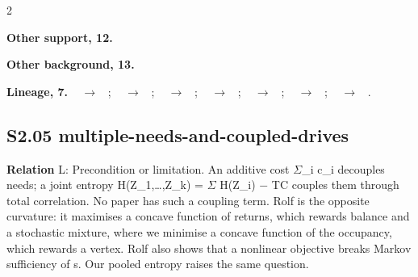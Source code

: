 \documentclass[10pt]{article}
\newcommand{\memb}[1]{\par\smallskip\textbf{#1}\quad}
\begin{document}
\begin{multicols}{2}
\memb{Other support, 12.} \citetext{\citealp{Sterling-allostasis12}; \citealp{Ramsay-clarifying14}; \citealp{Keramati-cocaine17}; \citealp{Schulkin-allostasis19}; \citealp{Fujiwara-gradual25}; \citealp{Nguy-allostatic26}; \citealp{Canamero-modeling97}; \citealp{Cos-hedonic13}; \citealp{Moerland-emotion18}; \citealp{Man-homeostasis19}; \citealp{Petzschner-computational21}; \citealp{Lee-life23}}

\memb{Other background, 13.} {\footnotesize \citetext{\citealp{Acevedo-allostatic17}\dag; \citealp{Ngo-homeostatic22}\dag; \citealp{Htet-allostatic25}; \citealp{Khan-social25}; \citealp{Ozdemir-social25}; \citealp{Hayes-predictive26}; \citealp{Craig-how02}; \citealp{Lewis-hedonic16}; \citealp{Kelkar-cognitive21}; \citealp{Sims-self22}; \citealp{Lones-homeostasis25}; \citealp{Usai-neuro25}; \citealp{CandiaRivera-interoceptive26}}}

\end{multicols}
\memb{Lineage, 7.} {\footnotesize \citeauthor{Cannon-wisdom32}~\citeyear{Cannon-wisdom32} $\to$ \citeauthor{Sterling-allostasis12}~\citeyear{Sterling-allostasis12}; \citeauthor{Canamero-modeling97}~\citeyear{Canamero-modeling97} $\to$ \citeauthor{Lones-hormone18}~\citeyear{Lones-hormone18}; \citeauthor{Sterling-allostasis12}~\citeyear{Sterling-allostasis12} $\to$ \citeauthor{Ramsay-clarifying14}~\citeyear{Ramsay-clarifying14}; \citeauthor{Sterling-allostasis12}~\citeyear{Sterling-allostasis12} $\to$ \citeauthor{Schulkin-allostasis19}~\citeyear{Schulkin-allostasis19}; \citeauthor{Sterling-allostasis12}~\citeyear{Sterling-allostasis12} $\to$ \citeauthor{Nguy-allostatic26}~\citeyear{Nguy-allostatic26}; \citeauthor{Keramati-homeostatic14}~\citeyear{Keramati-homeostatic14} $\to$ \citeauthor{Keramati-cocaine17}~\citeyear{Keramati-cocaine17}; \citeauthor{Keramati-homeostatic14}~\citeyear{Keramati-homeostatic14} $\to$ \citeauthor{Fujiwara-gradual25}~\citeyear{Fujiwara-gradual25}.}

\subsection{S2.05 multiple-needs-and-coupled-drives}\label{node:S2-S2-05-multiple-needs-and-coupled-drives}
\textbf{Relation} \textsf{L}: Precondition or limitation. An additive cost \ensuremath{\Sigma}\_i c\_i decouples needs; a joint entropy H(Z\_1,\dots{},Z\_k) = \ensuremath{\Sigma} H(Z\_i) \ensuremath{-} TC couples them through total correlation. No paper has such a coupling term. Rolf is the opposite curvature: it maximises a concave function of returns, which rewards balance and a stochastic mixture, where we minimise a concave function of the occupancy, which rewards a vertex. Rolf also shows that a nonlinear objective breaks Markov sufficiency of s. Our pooled entropy raises the same question.
\end{document}
